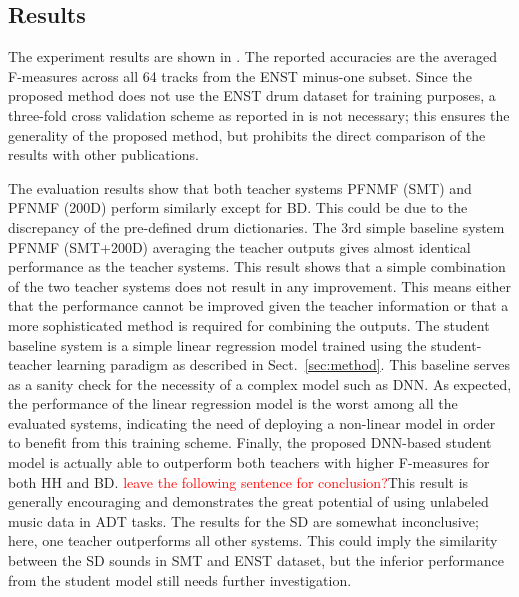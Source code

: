 \documentclass{article}
\begin{document}
\subsection{Results}
The experiment results are shown in . The reported accuracies are the averaged F-measures across all 64 tracks from the ENST minus-one subset. Since the proposed method does not use the ENST drum dataset for training purposes, a three-fold cross validation scheme as reported in \cite{Paulus2009a, Wu2015a, Vogl2016, Vogl2017, Southall2016} is not necessary; this ensures the generality of the proposed method, but prohibits the direct comparison of the results with other publications.  

%

%
The evaluation results show that both teacher systems PFNMF (SMT) and PFNMF (200D) perform similarly except for BD. This could be due to the discrepancy of the pre-defined drum dictionaries. 
The 3rd simple baseline system PFNMF (SMT+200D) averaging the teacher outputs gives almost identical performance as the teacher systems. This result shows that a simple combination of the two teacher systems does not result in any improvement. This means either that the performance cannot be improved given the teacher information or that a more sophisticated method is required for combining the outputs. 
The student baseline system is a simple linear regression model trained using the student-teacher learning paradigm as described in Sect.~\ref{sec:method}. This baseline serves as a sanity check for the necessity of a complex model such as DNN. As expected, the performance of the linear regression model is the worst among all the evaluated systems, indicating the need of deploying a non-linear model in order to benefit from this training scheme. 
Finally, the proposed DNN-based student model is actually able to outperform both teachers with higher F-measures for both HH and BD. {\textcolor{red}{leave the following sentence for conclusion?}}This result is generally encouraging and demonstrates the great potential of using unlabeled music data in ADT tasks. The results for the SD are somewhat inconclusive; here, one teacher outperforms all other systems. This could imply the similarity between the SD sounds in SMT and ENST dataset, but the inferior performance from the student model still needs further investigation. 
\end{document}

